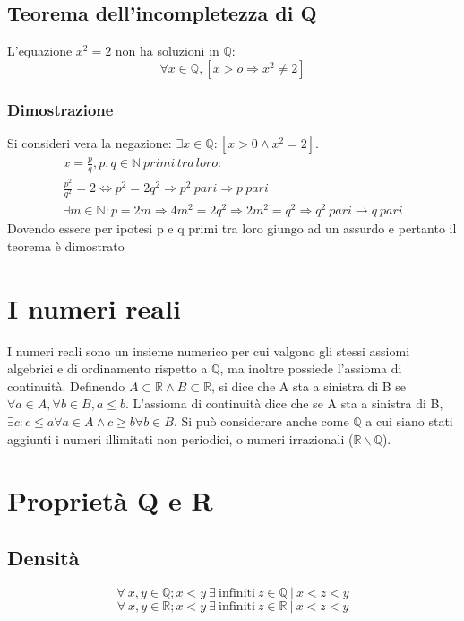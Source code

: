 \subsection{Teorema dell'incompletezza di Q}
L'equazione $x^2=2$ non ha soluzioni in $\mathbb{Q}$:
\begin{equation}
\forall x \in \mathbb{Q}, [x>o \Rightarrow x^2\ne 2]
\end{equation}
\subsubsection*{Dimostrazione}
Si consideri vera la negazione: $\exists x\in\mathbb{Q}:[x>0\wedge x^2=2]$.
\begin{gather*}
x=\frac{p}{q},p,q\in \mathbb{N}\:primi\,tra\,loro:\\
\frac{p^2}{q^2}=2\Leftrightarrow p^2=2q^2\Rightarrow p^2\:pari \Rightarrow p \: pari\\
\exists m\in\mathbb{N}:p=2m \Rightarrow 4m^2=2q^2\Rightarrow 2m^2=q^2\Rightarrow q^2\:pari\rightarrow q\:pari
\end{gather*}
Dovendo essere per ipotesi p e q primi tra loro giungo ad un assurdo e pertanto il teorema \`e dimostrato
\section{I numeri reali}
I numeri reali sono un insieme numerico per cui valgono gli stessi assiomi algebrici e di ordinamento rispetto a $\mathbb{Q}$, ma inoltre possiede l'assioma di continuit\`a.
Definendo $A \subset \mathbb{R} \wedge B \subset \mathbb{R}$, si dice che A sta a sinistra di B se $\forall a \in A, \forall b \in B, a\le b$. L'assioma di continuit\`a dice
che se A sta a sinistra di B, $\exists c: c\le a \forall a \in A \wedge c\ge b \forall b \in B$. Si pu\`o considerare anche come $\mathbb{Q}$ a cui siano stati aggiunti i 
numeri illimitati non periodici, o numeri irrazionali ($\mathbb{R}\backslash\mathbb{Q}$).\\

\section{Proprietà Q e R}
\subsection{Densità}
\begin{equation*}
\forall\ x,y \in \mathbb{Q}; x<y\ \exists\ \text{infiniti}\ z \in \mathbb{Q}\ |\ x<z<y
\end{equation*}
\begin{equation*}
\forall\ x,y \in \mathbb{R}; x<y\ \exists\ \text{infiniti}\ z \in \mathbb{R}\ |\ x<z<y
\end{equation*}
